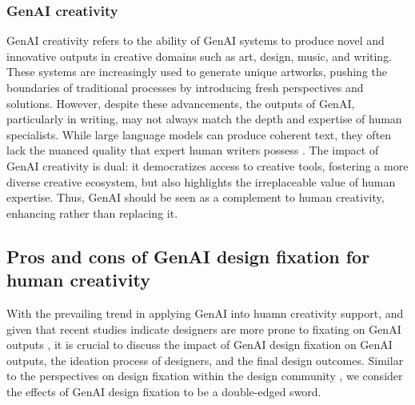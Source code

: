 \subsubsection{GenAI creativity}
GenAI creativity refers to the ability of GenAI systems to produce novel and innovative outputs in creative domains such as art, design, music, and writing. These systems are increasingly used to generate unique artworks, pushing the boundaries of traditional processes by introducing fresh perspectives and solutions. However, despite these advancements, the outputs of GenAI, particularly in writing, may not always match the depth and expertise of human specialists. While large language models can produce coherent text, they often lack the nuanced quality that expert human writers possess \cite{chakrabarty2024art}. The impact of GenAI creativity is dual: it democratizes access to creative tools, fostering a more diverse creative ecosystem, but also highlights the irreplaceable value of human expertise. Thus, GenAI should be seen as a complement to human creativity, enhancing rather than replacing it.


\subsection{Pros and cons of GenAI design fixation for human creativity}

With the prevailing trend in applying GenAI into huamn creativity support, and given that recent studies indicate designers are more prone to fixating on GenAI outputs \cite{wadinambiarachchi2024effects}, it is crucial to discuss the impact of GenAI design fixation on GenAI outputs, the ideation process of designers, and the final design outcomes. Similar to the perspectives on design fixation within the design community \cite{smith1993constraining, bilalic2008good}, we consider the effects of GenAI design fixation to be a double-edged sword.

